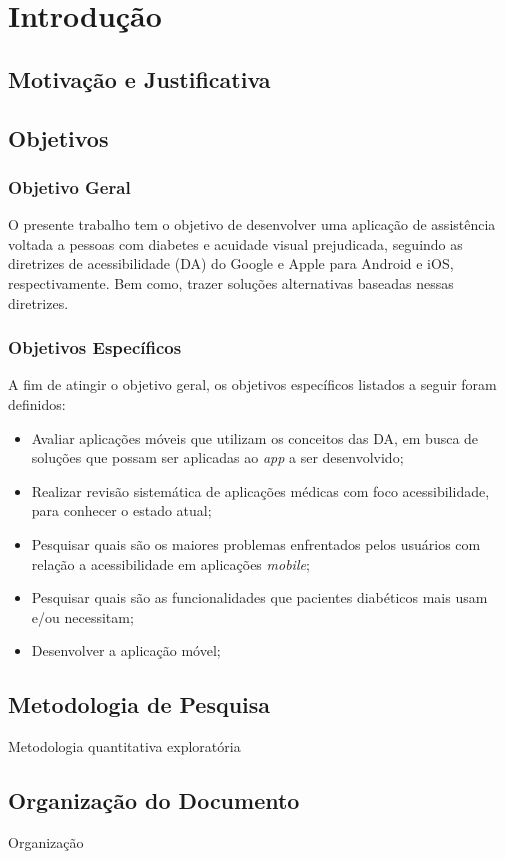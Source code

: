\chapter{Introdução}

\section{Motivação e Justificativa}

\section{Objetivos}

\subsection{Objetivo Geral}

O presente trabalho tem o objetivo de desenvolver uma aplicação de assistência voltada a pessoas com diabetes e acuidade visual prejudicada, seguindo as
diretrizes de acessibilidade (DA) do Google e Apple para Android e iOS, respectivamente. Bem como, trazer soluções alternativas baseadas nessas diretrizes.

\subsection{Objetivos Específicos}

A fim de atingir o objetivo geral, os objetivos específicos listados a seguir foram definidos:
\begin{itemize}
    \item Avaliar aplicações móveis que utilizam os conceitos das DA, em busca de soluções que possam ser aplicadas ao \textit{app} a ser desenvolvido;
    \item Realizar revisão sistemática de aplicações médicas com foco acessibilidade, para conhecer o estado atual;
    \item Pesquisar quais são os maiores problemas enfrentados pelos usuários com relação a acessibilidade em aplicações \textit{mobile};
    \item Pesquisar quais são as funcionalidades que pacientes diabéticos mais usam e/ou necessitam;
    \item Desenvolver a aplicação móvel;
\end{itemize}

\section{Metodologia de Pesquisa}

Metodologia quantitativa exploratória


\section{Organização do Documento}

Organização

